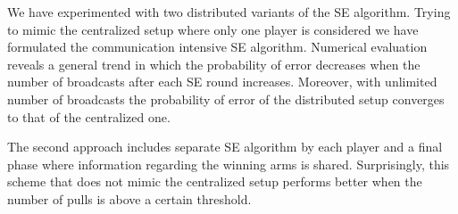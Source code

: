 \documentclass{sig-alternate}
\newcommand{\comment}[1]{}
\begin{document}
We have experimented with two distributed variants of the SE algorithm. Trying to mimic the centralized setup where only one player is considered we have formulated the communication intensive SE algorithm. Numerical evaluation reveals a general trend in which the probability of error decreases when the number of broadcasts after each SE round increases. Moreover, with unlimited number of broadcasts the probability of error of the distributed setup converges to that of the centralized one.

The second approach includes separate SE algorithm by each player and a final phase where information regarding the winning arms is shared. Surprisingly, this scheme that does not mimic the centralized setup performs better when the number of pulls is above a certain threshold. 
\comment{It is conjuctured that by conducting separate SE algorithms by each player we create an interplay between two trends. Using less pulls by each player the probability that the correct arm will be selected a player is decreased. On the other hand the final phase where information regarding the winning arms is shared provides a kind of ``soft'' decision that...} 












%
\end{document}

